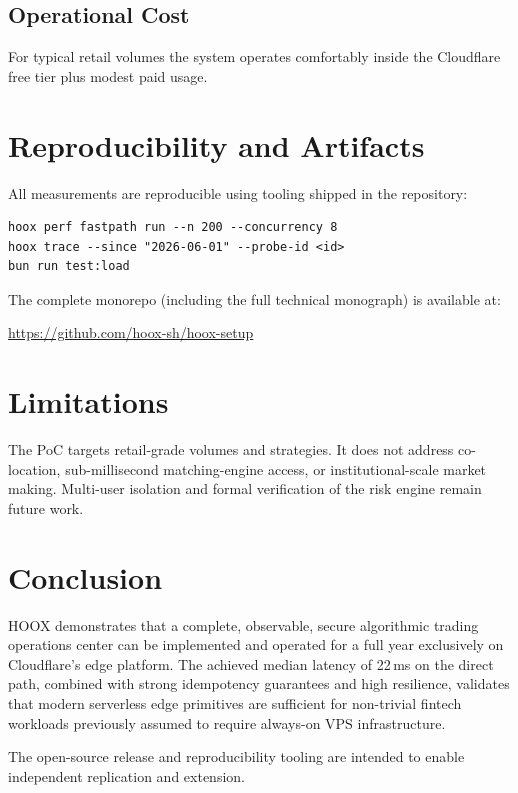 \documentclass[10pt,a4paper]{article}
\newcommand{\textsc}[1]{\textsf{\small #1}}
\begin{document}
\subsection{Operational Cost}

For typical retail volumes the system operates comfortably inside the Cloudflare free tier plus modest paid usage.

\section{Reproducibility and Artifacts}

All measurements are reproducible using tooling shipped in the repository:

\begin{verbatim}
hoox perf fastpath run --n 200 --concurrency 8
hoox trace --since "2026-06-01" --probe-id <id>
bun run test:load
\end{verbatim}

The complete monorepo (including the full technical monograph) is available at:

\url{https://github.com/hoox-sh/hoox-setup}

\section{Limitations}

The PoC targets retail-grade volumes and strategies. It does not address co-location, sub-millisecond matching-engine access, or institutional-scale market making. Multi-user isolation and formal verification of the risk engine remain future work.

\section{Conclusion}

\textsc{HOOX} demonstrates that a complete, observable, secure algorithmic trading operations center can be implemented and operated for a full year exclusively on Cloudflare's edge platform. The achieved median latency of 22\,ms on the direct path, combined with strong idempotency guarantees and high resilience, validates that modern serverless edge primitives are sufficient for non-trivial fintech workloads previously assumed to require always-on VPS infrastructure.

The open-source release and reproducibility tooling are intended to enable independent replication and extension.
\end{document}
